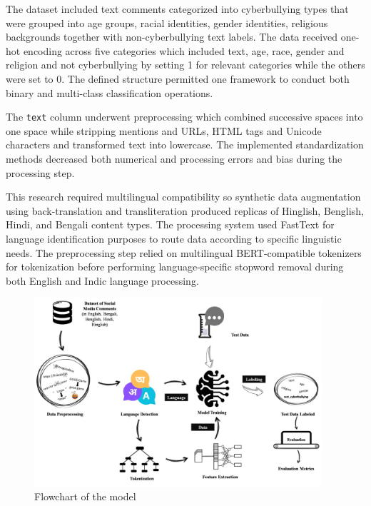 \documentclass[pdflatex,sn-mathphys-num]{sn-jnl}%
\theoremstyle{thmstyleone}%
\theoremstyle{thmstyletwo}%
\theoremstyle{thmstylethree}%
\begin{document}


The dataset included text comments categorized into cyberbullying types that were grouped into age groups, racial identities, gender identities, religious backgrounds together with non-cyberbullying text labels. The data received one-hot encoding across five categories which included text, age, race, gender and religion and not cyberbullying by setting 1 for relevant categories while the others were set to 0. The defined structure permitted one framework to conduct both binary and multi-class classification operations.

The \texttt{text} column underwent preprocessing which combined successive spaces into one space while stripping mentions and URLs, HTML tags and Unicode characters and transformed text into lowercase. The implemented standardization methods decreased both numerical and processing errors and bias during the processing step.

This research required multilingual compatibility so synthetic data augmentation using back-translation and transliteration produced replicas of Hinglish, Benglish, Hindi, and Bengali content types. The processing system used FastText for language identification purposes to route data according to specific linguistic needs. The preprocessing step relied on multilingual BERT-compatible tokenizers for tokenization before performing language-specific stopword removal during both English and Indic language processing.

\begin{figure}[H]
    \centering
    \includegraphics[width=0.95\textwidth]{Graphs/flowchart2.jpg}
    \caption{Flowchart of the model}
    \label{fig:flowchart}
\end{figure}
\end{document}
